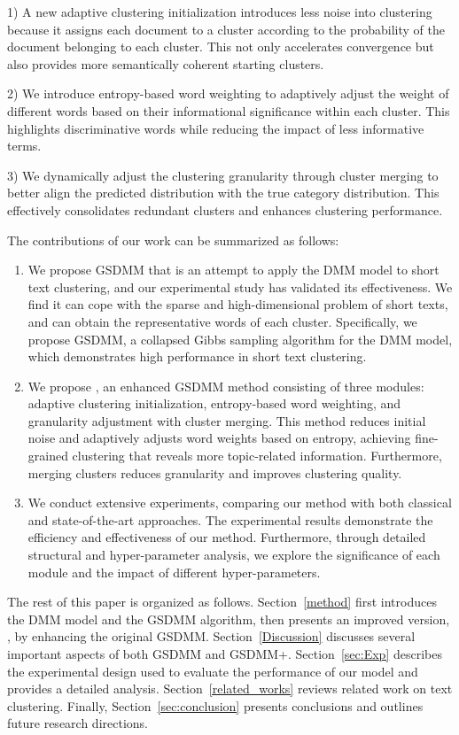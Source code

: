 1) A new adaptive clustering initialization introduces less noise into clustering because it assigns each document to a cluster according to the probability of the document belonging to each cluster. This not only accelerates convergence but also provides more semantically coherent starting clusters.

2) We introduce entropy-based word weighting to adaptively adjust the weight of different words based on their informational significance within each cluster. This highlights discriminative words while reducing the impact of less informative terms.

3) We dynamically adjust the clustering granularity through cluster merging to better align the predicted distribution with the true category distribution. This effectively consolidates redundant clusters and enhances clustering performance.

The contributions of our work can be summarized as follows: 
\begin{enumerate} 
    \item We propose GSDMM that is an attempt to apply the DMM model to short text clustering, and our experimental study has validated its effectiveness. We find it can cope with the sparse and high-dimensional problem of short texts, and can obtain the representative words of each cluster. Specifically, we propose GSDMM, a collapsed Gibbs sampling algorithm for the DMM model, which demonstrates high performance in short text clustering.
    \item We propose \sysname{}, an enhanced GSDMM method consisting of three modules: adaptive clustering initialization, entropy-based word weighting, and granularity adjustment with cluster merging. This method reduces initial noise and adaptively adjusts word weights based on entropy, achieving fine-grained clustering that reveals more topic-related information. Furthermore, merging clusters reduces granularity and improves clustering quality.
    \item We conduct extensive experiments, comparing our method with both classical and state-of-the-art approaches. The experimental results demonstrate the efficiency and effectiveness of our method. Furthermore, through detailed structural and hyper-parameter analysis, we explore the significance of each module and the impact of different hyper-parameters.
\end{enumerate}

The rest of this paper is organized as follows. Section~\ref{method} first introduces the DMM model and the GSDMM algorithm, then presents an improved version, \sysname{}, by enhancing the original GSDMM. Section~\ref{Discussion} discusses several important aspects of both GSDMM and GSDMM+. Section~\ref{sec:Exp} describes the experimental design used to evaluate the performance of our model and provides a detailed analysis. Section~\ref{related_works} reviews related work on text clustering. Finally, Section~\ref{sec:conclusion} presents conclusions and outlines future research directions.